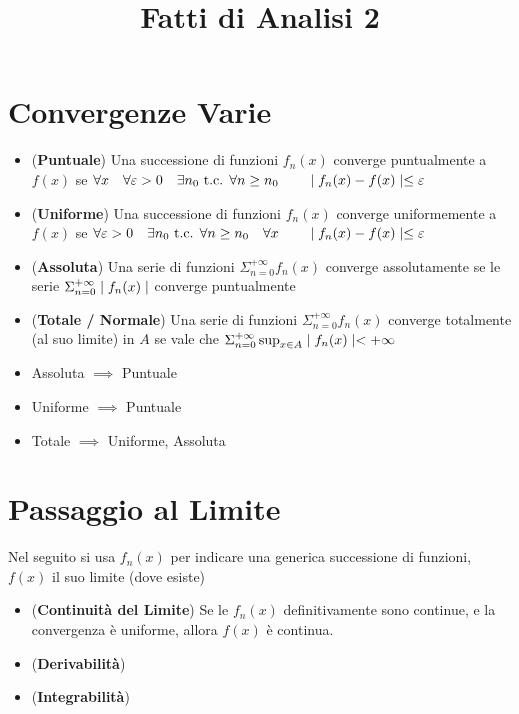 \documentclass[a4paper,NoNotes,GeneralMath]{stdmdoc}
\begin{document}
	\title{Fatti di Analisi 2}
	\author{}

	\section*{Convergenze Varie}
	\begin{itemize}
		\item ({\bf Puntuale}) Una successione di funzioni $f_n(x)$ converge puntualmente a $f(x)$ se $\forall x \quad \forall \varepsilon > 0 \quad \exists n_0 \mbox{ t.c. } \forall n \ge n_0 \qquad \mid f_n(x) - f(x) \mid \le \varepsilon$
		\item ({\bf Uniforme}) Una successione di funzioni $f_n(x)$ converge uniformemente a $f(x)$ se $\forall \varepsilon > 0 \quad \exists n_0 \mbox{ t.c. } \forall n \ge n_0 \quad \forall x \qquad \mid f_n(x) - f(x) \mid \le \varepsilon$
		\item ({\bf Assoluta}) Una serie di funzioni $\Sigma_{n=0}^{+\infty} f_n(x)$ converge assolutamente se le serie $\Sigma_{n=0}^{+\infty} \mid f_n(x) \mid$ converge puntualmente
		\item ({\bf Totale / Normale}) Una serie di funzioni $\Sigma_{n=0}^{+\infty} f_n(x)$ converge totalmente (al suo limite) in $A$ se vale che $\Sigma_{n=0}^{+\infty} \sup_{x\in A} \mid f_n(x) \mid < +\infty$
		\item Assoluta $\implies$ Puntuale
		\item Uniforme $\implies$ Puntuale
		\item Totale $\implies$ Uniforme, Assoluta
	\end{itemize}

	\section*{Passaggio al Limite}
	Nel seguito si usa $f_n(x)$ per indicare una generica successione di funzioni, $f(x)$ il suo limite (dove esiste)
	\begin{itemize}
		\item ({\bf Continuità del Limite}) Se le $f_n(x)$ definitivamente sono continue, e la convergenza è uniforme, allora $f(x)$ è continua.
		\item ({\bf Derivabilità}) 
		\item ({\bf Integrabilità}) 
	\end{itemize}
\end{document}

